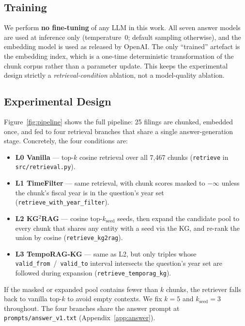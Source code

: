 \documentclass[11pt]{article}
\begin{document}
\subsection{Training}
\label{sec:training}
We perform \textbf{no fine-tuning} of any LLM in this work. All seven
answer models are used at inference only (temperature~0; default
sampling otherwise), and the embedding model is used as released by
OpenAI. The only ``trained'' artefact is the embedding index, which
is a one-time deterministic transformation of the chunk corpus rather
than a parameter update. This keeps the experimental design strictly a
\emph{retrieval-condition} ablation, not a model-quality ablation.

\subsection{Experimental Design}
\label{sec:pipeline}
Figure~\ref{fig:pipeline} shows the full pipeline: 25 filings are
chunked, embedded once, and fed to four retrieval branches that share
a single answer-generation stage. Concretely, the four conditions are:

\begin{itemize}
\itemsep 0pt \parskip 0pt
  \item \textbf{L0 Vanilla} --- top-$k$ cosine retrieval over all
    7{,}467 chunks (\texttt{retrieve} in \texttt{src/retrieval.py}).
  \item \textbf{L1 TimeFilter} --- same retrieval, with chunk scores
    masked to $-\infty$ unless the chunk's fiscal year is in the
    question's year set (\texttt{retrieve\_with\_year\_filter}).
  \item \textbf{L2 KG$^{2}$RAG} --- cosine top-$k_{\text{seed}}$
    seeds, then expand the candidate pool to every chunk that shares
    any entity with a seed via the KG, and re-rank the union by
    cosine (\texttt{retrieve\_kg2rag}).
  \item \textbf{L3 TempoRAG-KG} --- same as L2, but only triples whose
    \texttt{valid\_from}~/~\texttt{valid\_to} interval intersects the
    question's year set are followed during expansion
    (\texttt{retrieve\_temporag\_kg}).
\end{itemize}
If the masked or expanded pool contains fewer than $k$ chunks, the
retriever falls back to vanilla top-$k$ to avoid empty contexts. We
fix $k=5$ and $k_{\text{seed}}=3$ throughout. The four branches share
the answer prompt at \texttt{prompts/answer\_v1.txt}
(Appendix~\ref{app:answer}).
\end{document}
